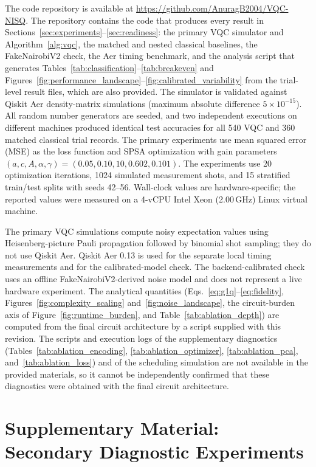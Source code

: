 \documentclass[final,5p,times,number]{elsarticle}
\begin{document}
The code repository is available at
\url{https://github.com/AnuragB2004/VQC-NISQ}.
The repository contains the code that produces every result in
Sections~\ref{sec:experiments}--\ref{sec:readiness}: the primary VQC
simulator and Algorithm~\ref{alg:vqc}, the matched and nested classical
baselines, the FakeNairobiV2 check, the Aer timing benchmark, and the
analysis script that generates Tables~\ref{tab:classification}--\ref{tab:breakeven}
and Figures~\ref{fig:performance_landscape}--\ref{fig:calibrated_variability}
from the trial-level result files, which are also provided. The simulator
is validated against Qiskit Aer density-matrix simulations (maximum
absolute difference $5\times10^{-15}$). All random number generators
are seeded, and two independent executions on different machines
produced identical test accuracies for all 540 VQC and 360 matched
classical trial records. The primary experiments use
mean squared error (MSE) as the loss function
and SPSA optimization with gain parameters
$(a,c,A,\alpha,\gamma)
=(0.05,0.10,10,0.602,0.101)$.
The experiments use 20 optimization iterations,
1024 simulated measurement shots, and 15
stratified train/test splits with seeds 42--56.
Wall-clock values are hardware-specific; the reported values were
measured on a 4-vCPU Intel Xeon (2.00\,GHz) Linux virtual machine.

The primary VQC simulations compute noisy
expectation values using Heisenberg-picture
Pauli propagation followed by binomial shot
sampling; they do not use Qiskit Aer. Qiskit Aer
0.13 is used for the separate local timing
measurements and for the calibrated-model check. The backend-calibrated
check uses an offline FakeNairobiV2-derived
noise model and does not represent a live
hardware experiment. The analytical quantities
(Eqs.~\eqref{eq:g1q}--\eqref{eq:fidelity},
Figures~\ref{fig:complexity_scaling} and~\ref{fig:noise_landscape},
the circuit-burden axis of Figure~\ref{fig:runtime_burden},
and Table~\ref{tab:ablation_depth}) are computed from the
final circuit architecture by a script supplied with this revision.
The scripts and execution logs of the supplementary diagnostics
(Tables~\ref{tab:ablation_encoding}, \ref{tab:ablation_optimizer},
\ref{tab:ablation_pca}, and~\ref{tab:ablation_loss}) and of the
scheduling simulation are not available in the provided materials, so
it cannot be independently confirmed that these diagnostics were
obtained with the final circuit architecture.


\newpage
\appendix
\section{Supplementary Material: Secondary Diagnostic Experiments}
\label{sec:supplementary}
\end{document}
